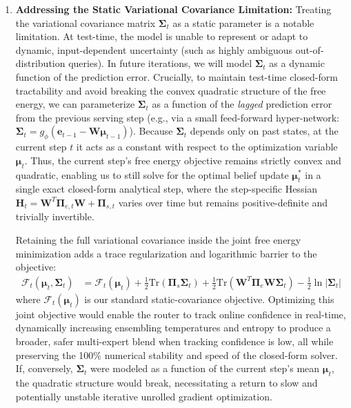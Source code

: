 \documentclass{article}
\theoremstyle{plain}
\theoremstyle{definition}
\theoremstyle{remark}
\begin{document}
\begin{enumerate}
    \item \textbf{Addressing the Static Variational Covariance Limitation:} Treating the variational covariance matrix $\mathbf{\Sigma}_t$ as a static parameter is a notable limitation. At test-time, the model is unable to represent or adapt to dynamic, input-dependent uncertainty (such as highly ambiguous out-of-distribution queries). In future iterations, we will model $\mathbf{\Sigma}_t$ as a dynamic function of the prediction error. Crucially, to maintain test-time closed-form tractability and avoid breaking the convex quadratic structure of the free energy, we can parameterize $\mathbf{\Sigma}_t$ as a function of the \emph{lagged} prediction error from the previous serving step (e.g., via a small feed-forward hyper-network: $\mathbf{\Sigma}_t = g_{\phi}(\mathbf{e}_{t-1} - \mathbf{W}\mathbf{\mu}_{t-1})$). Because $\mathbf{\Sigma}_t$ depends only on past states, at the current step $t$ it acts as a constant with respect to the optimization variable $\mathbf{\mu}_t$. Thus, the current step's free energy objective remains strictly convex and quadratic, enabling us to still solve for the optimal belief update $\mathbf{\mu}_t^*$ in a single exact closed-form analytical step, where the step-specific Hessian $\mathbf{H}_t = \mathbf{W}^T \mathbf{\Pi}_{e, t} \mathbf{W} + \mathbf{\Pi}_{s, t}$ varies over time but remains positive-definite and trivially invertible.

    Retaining the full variational covariance inside the joint free energy minimization adds a trace regularization and logarithmic barrier to the objective:
    \begin{equation}
    \begin{aligned}
    \mathcal{F}_t(\mathbf{\mu}_t, \mathbf{\Sigma}_t) &= \mathcal{F}_t(\mathbf{\mu}_t) + \frac{1}{2} \text{Tr}\left(\mathbf{\Pi}_s \mathbf{\Sigma}_t\right) + \frac{1}{2} \text{Tr}\left(\mathbf{W}^T \mathbf{\Pi}_e \mathbf{W} \mathbf{\Sigma}_t\right) - \frac{1}{2} \ln |\mathbf{\Sigma}_t|
    \end{aligned}
    \end{equation}
    where $\mathcal{F}_t(\mathbf{\mu}_t)$ is our standard static-covariance objective. Optimizing this joint objective would enable the router to track online confidence in real-time, dynamically increasing ensembling temperatures and entropy to produce a broader, safer multi-expert blend when tracking confidence is low, all while preserving the 100\% numerical stability and speed of the closed-form solver. If, conversely, $\mathbf{\Sigma}_t$ were modeled as a function of the current step's mean $\mathbf{\mu}_t$, the quadratic structure would break, necessitating a return to slow and potentially unstable iterative unrolled gradient optimization.


\end{enumerate}
\end{document}
